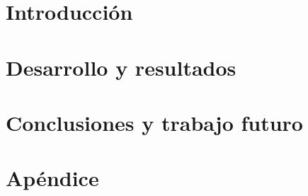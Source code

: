 \documentclass[11pt,a4paper,twoside]{tesis}
\begin{document}
\def\titulo{Licenciado}
\def\autor{Martín Ezequiel Langberg}
\def\tituloTesis{Predicción de patogenicidad en SNPs usando aprendizaje automático}
\def\runtitulo{Predicción de patogenicidad en polimorfismos de un sólo nucleótido usando aprendizaje automático}
\def\director{Ariel Berenstein}
\def\codirector{Pablo Turjanski}
\def\lugar{Buenos Aires, 2018}


\frontmatter
\pagestyle{empty}





\cleardoublepage
\tableofcontents

\mainmatter
\pagestyle{headings}


\chapter{Introducción}
\label{ch:introduccion}


\chapter{Desarrollo y resultados}
\label{ch:desarrollo}


\chapter{Conclusiones y trabajo futuro}
\label{ch:conclusiones}



\backmatter





\chapter{Apéndice}
\label{ch:apendice}

\end{document}
